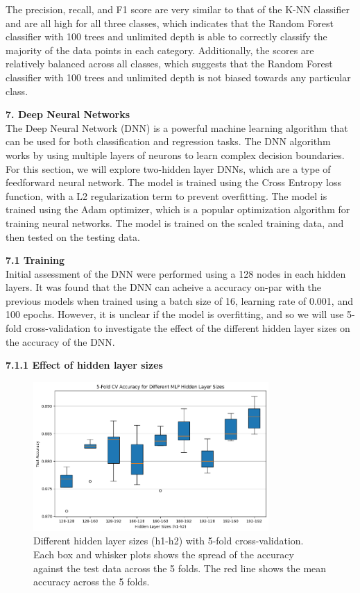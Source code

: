 \documentclass[12pt]{article}
\begin{document}
The precision, recall, and F1 score are very similar to that of the K-NN classifier and are all high for all three classes, which indicates that the Random Forest classifier with 100 trees and unlimited depth is able to correctly classify the majority of the data points in each category. Additionally, the scores are relatively balanced across all classes, which suggests that the Random Forest classifier with 100 trees and unlimited depth is not biased towards any particular class.

\vspace{20pt}

\textbf{7. Deep Neural Networks}
\\
The Deep Neural Network (DNN) is a powerful machine learning algorithm that can be used for both classification and regression tasks. The DNN algorithm works by using multiple layers of neurons to learn complex decision boundaries. For this section, we will explore two-hidden layer DNNs, which are a type of feedforward neural network. The model is trained using the Cross Entropy loss function, with a L2 regularization term to prevent overfitting. The model is trained using the Adam optimizer, which is a popular optimization algorithm for training neural networks. The model is trained on the scaled training data, and then tested on the testing data.

\vspace{20pt}

\textbf{7.1 Training}
\\
Initial assessment of the DNN were performed using a 128 nodes in each hidden layers. It was found that the DNN can acheive a accuracy on-par with the previous models when trained using a batch size of 16, learning rate of 0.001, and 100 epochs. However, it is unclear if the model is overfitting, and so we will use 5-fold cross-validation to investigate the effect of the different hidden layer sizes on the accuracy of the DNN.

\textbf{7.1.1 Effect of hidden layer sizes}


\begin{figure}[H]
\centering
\includegraphics[width=0.8\textwidth]{figures/dnn_crossval.png}
\caption{Different hidden layer sizes (h1-h2) with 5-fold cross-validation. Each box and whisker plots shows the spread of the accuracy against the test data across the 5 folds. The red line shows the mean accuracy across the 5 folds.}
\label{fig:dnn_training}
\end{figure}
\end{document}
